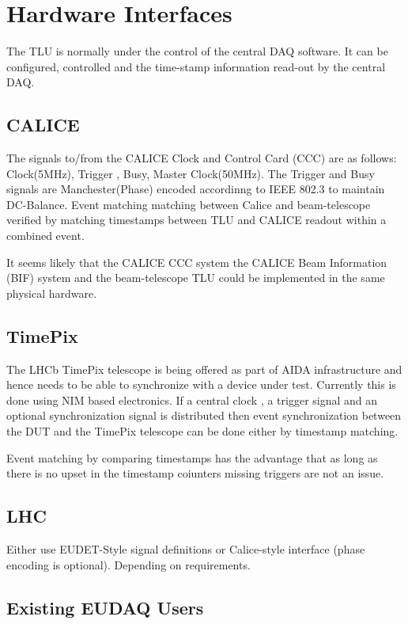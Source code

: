 \section{Hardware Interfaces}

The TLU is normally under the control of the central DAQ software. It
can be configured, controlled and the time-stamp information read-out
by the central DAQ.

\subsection{CALICE}

The signals to/from the CALICE Clock and Control Card (CCC) are as
follows: Clock(5MHz), Trigger , Busy, Master Clock(50MHz). The Trigger
and Busy signals are Manchester(Phase) encoded accordinng to IEEE
802.3 to maintain DC-Balance.  Event matching matching between Calice
and beam-telescope verified by matching timestamps between TLU and
CALICE readout within a combined event.

It seems likely that the CALICE CCC system the CALICE Beam Information
(BIF) system and the beam-telescope TLU could be implemented in the
same physical hardware.


\subsection{TimePix}

The LHCb TimePix telescope is being offered as part of AIDA
infrastructure and hence needs to be able to synchronize with a device
under test. Currently this is done using NIM based electronics. If a
central clock , a trigger signal and an optional synchronization
signal is distributed then event synchronization between the DUT and
the TimePix telescope can be done either by timestamp matching.

Event matching by comparing timestamps has the advantage that 
as long as there is no upset in the timestamp coiunters missing
triggers are not an issue.

\subsection{LHC}

Either use EUDET-Style signal definitions or Calice-style interface (phase
encoding is optional). Depending on requirements.

\subsection{Existing EUDAQ Users}

